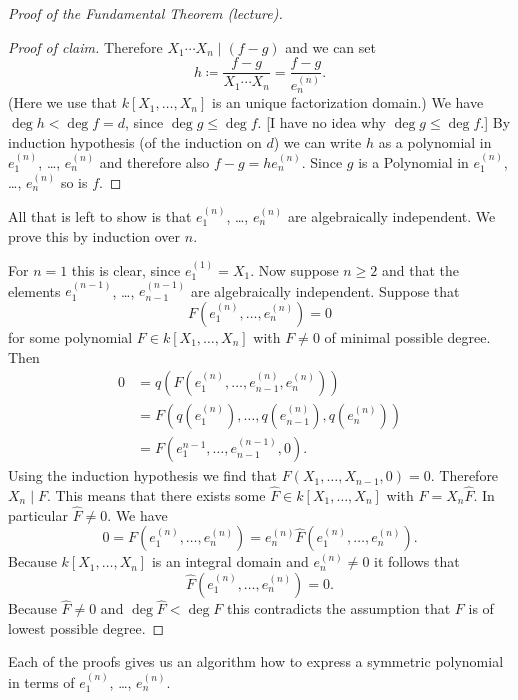 \begin{proof}[Proof of the Fundamental Theorem (lecture)]
\begin{proof}[Proof of claim]
    Therefore $X_1 \dotsm X_n \mid (f-g)$ and we can set
    \[
                h
      \coloneqq \frac{f-g}{X_1 \dotsm X_n}
      =         \frac{f-g}{e^{(n)}_n}.
    \]
    (Here we use that $k[X_1, \dotsc, X_n]$ is an unique factorization domain.)
    We have $\deg h < \deg f = d$, since $\deg g \leq \deg f$.
    [I have no idea why $\deg g \leq \deg f$.]
    By induction hypothesis (of the induction on $d$) we can write $h$ as a polynomial in $e^{(n)}_1$, \dots, $e^{(n)}_n$ and therefore also $f-g = h e^{(n)}_n$.
    Since $g$ is a Polynomial in $e^{(n)}_1$, \dots, $e^{(n)}_n$ so is $f$.
  \end{proof}
  All that is left to show is that $e^{(n)}_1$, \dots, $e^{(n)}_n$ are algebraically independent.
  We prove this by induction over $n$.
  
  For $n = 1$ this is clear, since $e^{(1)}_1 = X_1$.
  Now suppose $n \geq 2$ and that the elements $e^{(n-1)}_1$, \dots, $e^{(n-1)}_{n-1}$ are algebraically independent.
  Suppose that
  \[
      F\left(e^{(n)}_1, \dotsc, e^{(n)}_n\right)
    = 0
  \]
  for some polynomial $F \in k[X_1, \dotsc, X_n]$ with $F \neq 0$ of minimal possible degree.
  Then
  \begin{align*}
        0
    &=  q \left( F \left( e^{(n)}_1, \dotsc, e^{(n)}_{n-1}, e^{(n)}_n \right) \right) \\
    &=  F \left(
            q \left( e^{(n)}_1 \right), \dotsc, q \left( e^{(n)}_{n-1} \right), q \left( e^{(n)}_n \right)
          \right) \\
    &=  F \left( e^{n-1}_1, \dotsc, e^{(n-1)}_{n-1}, 0 \right).
  \end{align*}
  Using the induction hypothesis we find that $F(X_1, \dotsc, X_{n-1}, 0) = 0$.
  Therefore $X_n \mid F$.
  This means that there exists some $\hat{F} \in k[X_1, \dotsc, X_n]$ with $F = X_n \hat{F}$.
  In particular $\hat{F} \neq 0$.
  We have
  \[
      0
    = F\left( e^{(n)}_1, \dotsc, e^{(n)}_n \right)
    = e^{(n)}_n \hat{F}\left( e^{(n)}_1, \dotsc, e^{(n)}_n \right).
  \]
  Because $k[X_1, \dotsc, X_n]$ is an integral domain and $e^{(n)}_n \neq 0$ it follows that
  \[
      \hat{F}\left( e^{(n)}_1, \dotsc, e^{(n)}_n \right)
    = 0.
  \]
  Because $\hat{F} \neq 0$ and $\deg \hat{F} < \deg F$ this contradicts the assumption that $F$ is of lowest possible degree.
\end{proof}


\begin{rem}
  Each of the proofs gives us an algorithm how to express a symmetric polynomial in terms of $e^{(n)}_1$, \dots, $e^{(n)}_n$.
\end{rem}


